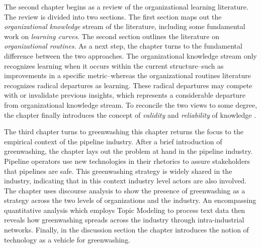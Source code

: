 
The second chapter begins as a review of the organizational learning literature. The review is divided into two sections. The first section maps out the \textit{organizational knowledge} stream of the literature, including some fundamental work on \textit{learning curves}. The second section outlines the literature on \textit{organizational routines}. As a next step, the chapter turns to the fundamental difference between the two approaches. The organizational knowledge stream only recognizes learning when it occurs within the current structure--such as improvements in a specific metric--whereas the organizational routines literature recognizes radical departures as learning. These radical departures may compete with or invalidate previous insights, which represents a considerable departure from organizational knowledge stream. To reconcile the two views to some degree, the chapter finally introduces the concept of \textit{validity} and \textit{reliability} of knowledge \citep{Rerup2020}.

The third chapter turns to greenwashing this chapter returns the focus to the empirical context of the pipeline industry. After a brief introduction of greenwashing, the chapter lays out the problem at hand in the pipeline industry. Pipeline operators use new technologies in their rhetorics to assure stakeholders that pipelines are safe. This greenwashing strategy is widely shared in the industry, indicating that in this context industry level actors are also involved. The chapter uses discourse analysis to show the presence of greenwashing as a strategy across the two levels of organizations and the industry. An encompassing quantitative analysis which employs Topic Modeling to process text data \citep{Hannigan2019} then reveals how greenwashing spreads across the industry through intra-industrial networks. Finally, in the discussion section the chapter introduces the notion of technology as a vehicle for greenwashing. %

